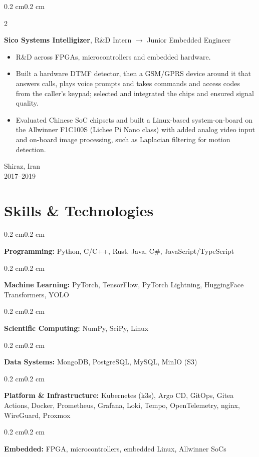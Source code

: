 \documentclass[10pt, letterpaper]{article}
\newenvironment{highlights}{
    \begin{itemize}[
        topsep=0.10 cm,
        parsep=0.10 cm,
        partopsep=0pt,
        itemsep=0pt,
        leftmargin=0.4 cm + 10pt
    ]
}{
    \end{itemize}
}
\newenvironment{onecolentry}{
    \begin{adjustwidth}{0.2 cm}{0.2 cm}
}{
    \end{adjustwidth}
}
\newenvironment{twocolentry}[2][]{
    \onecolentry
    \def\secondColumn{#2}
    \setcolumnwidth{\fill, 4.5 cm}
    \begin{paracol}{2}
}{
    \switchcolumn \raggedleft \secondColumn
    \end{paracol}
    \endonecolentry
}
\begin{document}
    \begin{twocolentry}{Shiraz, Iran \\ 2017--2019}
        \textbf{Sico Systems Intelligizer}, R\&D Intern $\rightarrow$ Junior Embedded Engineer
        \begin{highlights}
            \item R\&D across FPGAs, microcontrollers and embedded hardware.
            \item Built a hardware DTMF detector, then a GSM/GPRS device around it that answers calls, plays voice prompts and takes commands and access codes from the caller's keypad; selected and integrated the chips and ensured signal quality.
            \item Evaluated Chinese SoC chipsets and built a Linux-based system-on-board on the Allwinner F1C100S (Lichee Pi Nano class) with added analog video input and on-board image processing, such as Laplacian filtering for motion detection.
        \end{highlights}
    \end{twocolentry}

    \section{Skills \& Technologies}
    \begin{onecolentry}
        \textbf{Programming:} Python, C/C++, Rust, Java, C\#, JavaScript/TypeScript
    \end{onecolentry}
    \begin{onecolentry}
        \textbf{Machine Learning:} PyTorch, TensorFlow, PyTorch Lightning, HuggingFace Transformers, YOLO
    \end{onecolentry}
    \begin{onecolentry}
        \textbf{Scientific Computing:} NumPy, SciPy, Linux
    \end{onecolentry}
    \begin{onecolentry}
        \textbf{Data Systems:} MongoDB, PostgreSQL, MySQL, MinIO (S3)
    \end{onecolentry}
    \begin{onecolentry}
        \textbf{Platform \& Infrastructure:} Kubernetes (k3s), Argo CD, GitOps, Gitea Actions, Docker, Prometheus, Grafana, Loki, Tempo, OpenTelemetry, nginx, WireGuard, Proxmox
    \end{onecolentry}
    \begin{onecolentry}
        \textbf{Embedded:} FPGA, microcontrollers, embedded Linux, Allwinner SoCs
    \end{onecolentry}
\end{document}
